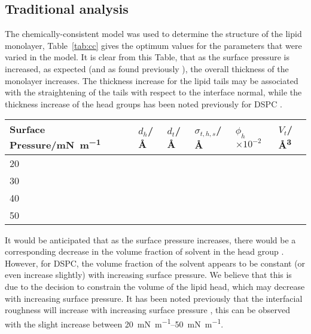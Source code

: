 \documentclass[amsmath,amssymb,twocolumn,superscriptaddress]{revtex4-1}
\begin{document}
\subsection{Traditional analysis}
The chemically-consistent model was used to determine the structure of the lipid monolayer, Table~\ref{tab:cc} gives the optimum values for the parameters that were varied in the model.
It is clear from this Table, that as the surface pressure is increased, as expected (and as found previously \cite{mohwald_phospholipid_1990,vaknin_structural_1991}), the overall thickness of the monolayer increases.
The thickness increase for the lipid tails may be associated with the straightening of the tails with respect to the interface normal, while the thickness increase of the head groups has been noted previously for DSPC \cite{hollinshead_effects_2009}.
%
\begin{table*}
\small
  \caption{\ The values for the parameters allowed to vary in the fitting of the chemically-consistent model, at each surface pressure measured.}
  \label{tab:cc}
  \begin{tabular*}{\textwidth}{@{\extracolsep{\fill}}llllll}
    \hline
    Surface Pressure/\si{\milli\newton\per\meter} & $d_h$/\si{\angstrom} & $d_t$/\si{\angstrom} & $\sigma_{t,h,s}$/\si{\angstrom} & $\phi_h$$\times10^{-2}$ & $V_t$/\si{\angstrom\cubed} \\
    \hline
    20 &  &  &  &  &  \\
    30 &  &  &  &  &  \\
    40 &  &  &  &  &  \\
    50 &  &  &  &  &  \\
    \hline
  \end{tabular*}
\end{table*}
%

It would be anticipated that as the surface pressure increases, there would be a corresponding decrease in the volume fraction of solvent in the head group \cite{bayerl_specular_1990}.
However, for DSPC, the volume fraction of the solvent appears to be constant (or even increase slightly) with increasing surface pressure.
We believe that this is due to the decision to constrain the volume of the lipid head, which may decrease with increasing surface pressure.
It has been noted previously that the interfacial roughness will increase with increasing surface pressure \cite{lu_aspects_1994}, this can be observed with the slight increase between \SIrange{20}{50}{\milli\newton\per\meter}.
\end{document}
